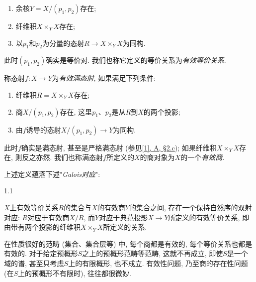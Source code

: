 \begin{enumerate}
    
 \item[i.]余核\(Y=X/(p_1,p_2)\)存在;

    
 \item[ii.]纤维积\(X\times _Y X\)存在;

    
 \item[iii.]以\(p_1\)和\(p_2\)为分量的态射\(R\to  X\times _Y X\)为同构.

  
\end{enumerate} 此时\((p_1,p_2)\)确实是等价对. 我们也称它定义的等价关系为\emph{有效等价关系}.
\par{}称态射\(f\colon  X\to  Y\)为\emph{有效满态射}, 如果满足下列条件: 
\begin{enumerate}
    
 \item[i.]纤维积\(R=X\times _Y X\)存在;

    
 \item[ii.]商\(X/(p_1,p_2)\)存在, 这里\(p_1\)、\(p_2\)是从\(R\)到\(X\)的两个投影;

    
 \item[iii.]由\(f\)诱导的态射\(X/(p_1,p_2)\to  Y\)为同构.

  
\end{enumerate} 此时\(f\)确实是满态射, 甚至是严格满态射 (参见\hyperref[fga3.i-a.2.c]{[1], A, §2.c}); 如果纤维积\(X\times _Y X\)存在, 则反之亦然. 我们也称满态射\(f\)所定义的\(X\)的商对象为\(X\)的一个\emph{有效商}.
\par{}上述定义蕴涵下述"\emph{Galois对应}":
\begin{proposition}{1.1}\label{fga3.iii-1-proposition-1.1}\skipsinglepar
\par{}\(X\)上有效等价关系\(R\)的集合与\(X\)的有效商\(Y\)的集合之间, 存在一个保持自然序的双射对应: \(R\)对应于有效商\(X/R\), 而\(Y\)对应于典范投影\(X\to  Y\)所定义的有效等价关系, 即由带有两个投影的纤维积\(X\times _Y X\)所定义的关系.
\end{proposition}
\par{}在性质很好的范畴 (集合、集合层等) 中, 每个商都是有效的, 每个等价关系也都是有效的. 对于给定预概形\(S\)之上的预概形范畴等范畴, 这就不再成立, 即使\(S\)是一个域的谱, 甚至只考虑\(S\)上的有限概形, 也不成立. 有效性问题, 乃至商的存在性问题 (在\(S\)上的预概形不有限时), 往往都很微妙.
